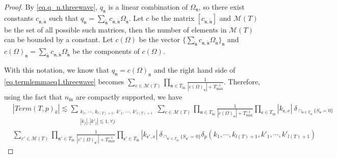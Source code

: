 \begin{proof}
By \eqref{eq.q_n.threewave}, $q_{\mathfrak{n}}$ is a linear combination of $\Omega_{\mathfrak{n}}$, so there exist constants $c_{\mathfrak{n},\widetilde{\mathfrak{n}}}$ such that $q_{\mathfrak{n}}=\sum_{\widetilde{\mathfrak{n}}}c_{\mathfrak{n},\widetilde{\mathfrak{n}}}\Omega_{\widetilde{\mathfrak{n}}}$. Let $c$ be the matrix $[c_{\mathfrak{n},\widetilde{\mathfrak{n}}}]$ and $\mathscr{M}(T)$ be the set of all possible such matrices, then the number of elements in $\mathscr{M}(T)$ can be bounded by a constant. Let $c(\Omega)$ be the vector $\{\sum_{\widetilde{\mathfrak{n}}}c_{\mathfrak{n},\widetilde{\mathfrak{n}}}\Omega_{\widetilde{\mathfrak{n}}}\}_{\mathfrak{n}}$ and $c(\Omega)_{\mathfrak{n}}=\sum_{\widetilde{\mathfrak{n}}}c_{\mathfrak{n},\widetilde{\mathfrak{n}}}\Omega_{\widetilde{\mathfrak{n}}}$ be the components of $c(\Omega)$.

With this notation, we know that $q_{\mathfrak{n}}=c(\Omega)_{\mathfrak{n}}$ and the right hand side of \eqref{eq.termlemmaeq1.threewave} becomes $\sum_{c\in \mathscr{M}(T) }\prod_{\mathfrak{n}\in T_{\text{in}}} \frac{1}{|c(\Omega)_{\mathfrak{n}}|+T^{-1}_{\text{max}}}$. Therefore, using the fact that $n_{\textrm{in}}$ are compactly supported, we have
\begin{equation}\label{eq.termlemmaeq3.threewave}
\begin{split}
    &|Term(T, p)_k|\lesssim \sum_{\substack{k_1,\, \cdots,\, k_{l(T)+1},\, k'_1,\, \cdots,\, k'_{l(T)+1}\\ |k_{j}|, |k'_j|\lesssim 1, \forall j}} \sum_{c\in \mathscr{M}(T) }\prod_{\mathfrak{n}\in T_{\text{in}}}\frac{1}{|c(\Omega)_{\mathfrak{n}}|+T^{-1}_{\text{max}}} \prod_{\mathfrak{e}\in T_{\text{in}}} |k_{\mathfrak{e},x}|\ \delta_{\cap_{\mathfrak{n}\in T_{\text{in}}} \{S_{\mathfrak{n}}=0\}} 
    \\
    &\sum_{c'\in \mathscr{M}(T)}\prod_{\mathfrak{n}'\in T_{\text{in}}}\frac{1}{|c'(\Omega)_{\mathfrak{n}'}|+T^{-1}_{\text{max}}}\prod_{\mathfrak{e}'\in T_{\text{in}}}|k_{\mathfrak{e}',x}|\ \delta_{\cap_{\mathfrak{n}'\in T_{\text{in}}} \{S_{\mathfrak{n}'}=0\}} \delta_{p}(k_1,\cdots, k_{l(T)+1}, k'_1,\cdots, k'_{l(T)+1})
\end{split}
\end{equation}


\end{proof}
